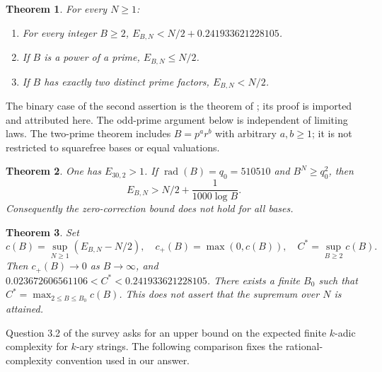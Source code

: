 \documentclass[11pt]{article}
\newtheorem{theorem}{Theorem}[section]
\theoremstyle{definition}\newtheorem{definition}[theorem]{Definition}
\theoremstyle{remark}\newtheorem{remark}[theorem]{Remark}
\newcommand{\rad}{\operatorname{rad}}
\begin{document}
\begin{theorem}\label{thm:main}
For every \(N\ge1\):
\begin{enumerate}
\item For every integer \(B\ge2\), \(E_{B,N}<N/2+0.241933621228105\).
\item If \(B\) is a power of a prime, \(E_{B,N}\le N/2\).
\item If \(B\) has exactly two distinct prime factors, \(E_{B,N}<N/2\).
\end{enumerate}
\end{theorem}
The binary case of the second assertion is the theorem of
\cite[Theorem 1.1]{binary}; its proof is imported and attributed here. The odd-prime
argument below is independent of limiting laws. The two-prime theorem
includes \(B=p^a r^b\) with arbitrary \(a,b\ge1\); it is not restricted to
squarefree bases or equal valuations.

\begin{theorem}\label{thm:positive}
One has \(E_{30,2}>1\). If \(\rad(B)=q_0=510510\) and \(B^N\ge q_0^2\),
then
\[
 E_{B,N}>N/2+\frac{1}{1000\log B}.
\]
Consequently the zero-correction bound does not hold for all bases.
\end{theorem}

\begin{theorem}\label{thm:optimal}
Set
\[
 c(B)=\sup_{N\ge1}(E_{B,N}-N/2),\quad c_+(B)=\max(0,c(B)),\quad
 C^*=\sup_{B\ge2}c(B).
\]
Then \(c_+(B)\to0\) as \(B\to\infty\), and
\(0.023672606561106<C^*<0.241933621228105\).
There exists a finite \(B_0\) such that
\(C^*=\max_{2\le B\le B_0}c(B)\).
This does not assert that the supremum over \(N\) is attained.
\end{theorem}

Question 3.2 of the survey \cite[p.~20282]{survey} asks for an upper bound
on the expected finite \(k\)-adic complexity for \(k\)-ary strings.
The following comparison fixes the rational-complexity convention used
in our answer.
\end{document}
